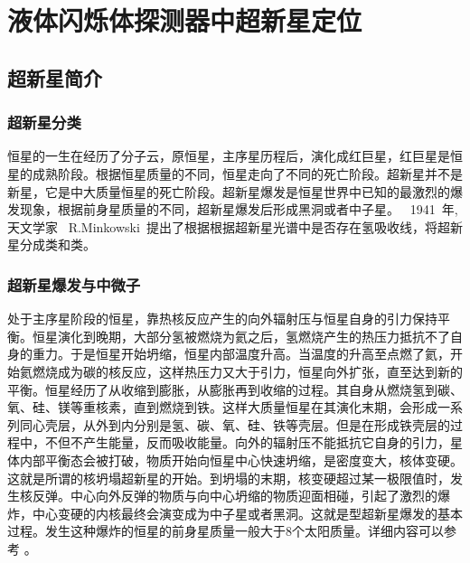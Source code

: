 
\chapter{液体闪烁体探测器中超新星定位}
\label{chap:chap6}
\section{超新星简介}
\subsection{超新星分类}
恒星的一生在经历了分子云，原恒星，主序星历程后，演化成红巨星，红巨星是恒星的成熟阶段。根据恒星质量的不同，恒星走向了不同的死亡阶段。超新星并不是新星，它是中大质量恒星的死亡阶段。超新星爆发是恒星世界中已知的最激烈的爆发现象，根据前身星质量的不同，超新星爆发后形成黑洞或者中子星。
~1941~年, 天文学家 ~R.Minkowski~提出了根据根据超新星光谱中是否存在氢吸收线，将超新星分成\uppercase\expandafter{}类和\uppercase\expandafter{}类。
\subsection{超新星爆发与中微子}
处于主序星阶段的恒星，靠热核反应产生的向外辐射压与恒星自身的引力保持平衡。恒星演化到晚期，大部分氢被燃烧为氦之后，氢燃烧产生的热压力抵抗不了自身的重力。于是恒星开始坍缩，恒星内部温度升高。当温度的升高至点燃了氦，开始氦燃烧成为碳的核反应，这样热压力又大于引力，恒星向外扩张，直至达到新的平衡。恒星经历了从收缩到膨胀，从膨胀再到收缩的过程。其自身从燃烧氢到碳、氧、硅、镁等重核素，直到燃烧到铁。这样大质量恒星在其演化末期，会形成一系列同心壳层，从外到内分别是氢、碳、氧、硅、铁等壳层。但是在形成铁壳层的过程中，不但不产生能量，反而吸收能量。向外的辐射压不能抵抗它自身的引力，星体内部平衡态会被打破，物质开始向恒星中心快速坍缩，是密度变大，核体变硬。这就是所谓的核坍塌超新星的开始。到坍塌的末期，核变硬超过某一极限值时，发生核反弹。中心向外反弹的物质与向中心坍缩的物质迎面相碰，引起了激烈的爆炸，中心变硬的内核最终会演变成为中子星或者黑洞。这就是\uppercase\expandafter{}型超新星爆发的基本过程。发生这种爆炸的恒星的前身星质量一般大于8个太阳质量。详细内容可以参考
\citep{bethe1990supernova}。


